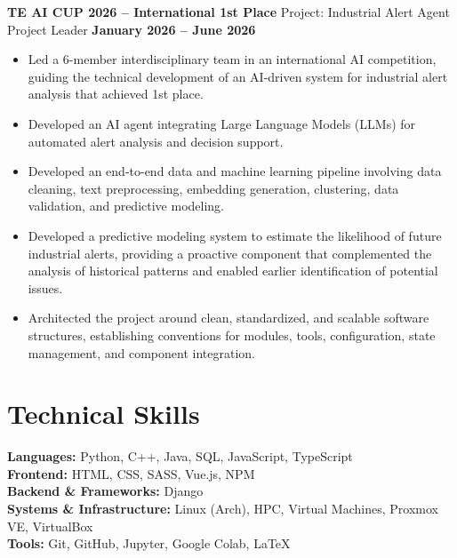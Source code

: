 \documentclass[11pt]{article}
\begin{document}
\textbf{TE AI CUP 2026 -- International 1st Place} \hfill Project: Industrial Alert Agent\\
Project Leader \hfill \textbf{January 2026 -- June 2026}
\vspace{-0.3cm}
\begin{itemize}[leftmargin=*]
    \item Led a 6-member interdisciplinary team in an international AI competition, guiding the technical development of an AI-driven system for industrial alert analysis that achieved 1st place. 

    \vspace{-0.3cm} 
    \item Developed an AI agent integrating Large Language Models (LLMs) for automated alert analysis and decision support.

    \vspace{-0.3cm} 
    \item Developed an end-to-end data and machine learning pipeline involving data cleaning, text preprocessing, embedding generation, clustering, data validation, and predictive modeling. 

    \vspace{-0.3cm}
    \item Developed a predictive modeling system to estimate the likelihood of future industrial alerts, providing a proactive component that complemented the analysis of historical patterns and enabled earlier identification of potential issues.

    \vspace{-0.3cm} 
    \item Architected the project around clean, standardized, and scalable software structures, establishing conventions for modules, tools, configuration, state management, and component integration. 
\end{itemize}





\section*{Technical Skills}
\textbf{Languages:} Python, C++, Java, SQL, JavaScript, TypeScript\\
\textbf{Frontend:} HTML, CSS, SASS, Vue.js, NPM\\
\textbf{Backend \& Frameworks:} Django\\
\textbf{Systems \& Infrastructure:} Linux (Arch), HPC, Virtual Machines, Proxmox VE, VirtualBox\\
\textbf{Tools:} Git, GitHub, Jupyter, Google Colab, LaTeX
\end{document}
